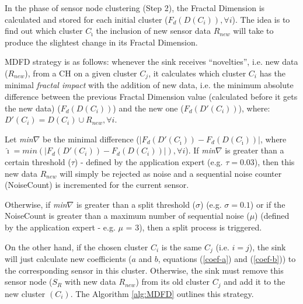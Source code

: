 \documentclass{acm_proc_article-sp}
\begin{document}
In the phase of sensor node clustering (Step 2), the Fractal Dimension is 
calculated and stored for each initial cluster
($F_{d}(D(C_i)), \forall i$). The idea is to find out which cluster
$C_{\hat{\imath}}$ the inclusion of new sensor data $R_{new}$ will take to produce
the slightest change in its Fractal Dimension.
\vspace*{-.3cm}

MDFD strategy is as follows:
whenever the sink receives ``novelties'', i.e. new data ($R_{new}$), from a CH on
a given cluster $C_j$, it calculates which cluster $C_i$ has the minimal
\textit{fractal impact} with the addition of new data, i.e. the minimum absolute
difference between the previous Fractal Dimension value (calculated before it
gets the new data) ($F_d(D(C_i))$) and the new one ($F_d(D'(C_i))$), where:
$D'(C_i) = D(C_i) \cup R_{new}, \forall i$.
\vspace*{-.3cm}

Let {\it min}$\nabla$ be the minimal difference ($|F_d(D'(C_{\hat{\imath}})) -
F_d(D(C_{\hat{\imath}}))|$, where $\hat{\imath} = min(|F_d(D'(C_i)) - F_d(D(C_i))|),
\forall i$). If {\it min}$\nabla$ is greater than a certain threshold ($\tau$) -
defined by the application expert (e.g. $\tau = 0.03$), then this new data
$R_{new}$ will simply be rejected as noise and a sequential noise counter
(NoiseCount) is incremented for the current sensor.
\vspace*{-.3cm}

Otherwise, if {\it min}$\nabla$ is greater than a split threshold ($\sigma$)
(e.g. $\sigma = 0.1$) or if the NoiseCount is greater than a maximum number of
sequential noise ($\mu$) (defined by the application expert - e.g. $\mu$ = 3),
then a split process is triggered.
\vspace*{-.3cm}

On the other hand, if the chosen cluster $C_i$ is the same $C_j$ (i.e.
$i=j$), the sink will just calculate new coefficients ($a$ and $b$, equations
(\ref{coef-a}) and (\ref{coef-b})) to the corresponding sensor in this cluster.
Otherwise, the sink must remove this sensor node ($S_{R}$ with new data
$R_{new}$) from its old cluster $C_j$ and add it to the new cluster $(C_i)$.
The Algorithm \ref{alg:MDFD} outlines this strategy.
\end{document}
